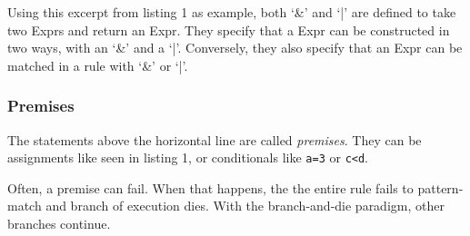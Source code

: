   Using this excerpt from listing 1 as example, both `\&' and `|' are defined to take two Exprs and return an Expr.
  They specify that a Expr can be constructed in two ways, with an `\&' and a `|'.
  Conversely, they also specify that an Expr can be matched in a rule with `\&' or `|'. 

  \subsubsection*{Premises}
  The statements above the horizontal line are called \textit{premises}.
  They can be assignments like seen in listing 1, or conditionals like \verb|a=3| or \verb|c<d|.

  Often, a premise can fail.
  When that happens, the the entire rule fails to pattern-match and branch of execution dies.
  With the branch-and-die paradigm, other branches continue.

